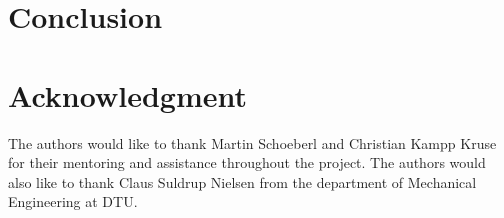 \documentclass[conference]{IEEEtran}
\begin{document}
\section{Conclusion}



\section*{Acknowledgment}
The authors would like to thank Martin Schoeberl and Christian Kampp Kruse for their mentoring and assistance throughout the project. The authors would also like to thank Claus Suldrup Nielsen from the department of Mechanical Engineering at DTU.


\printbibliography
\end{document}
